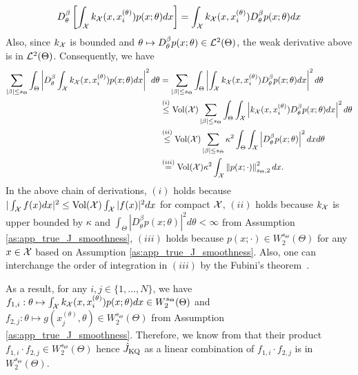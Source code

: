 \begin{equation*}
    D_\theta^\beta \left[\int_{\mathcal{X}} k_{\mathcal{X}} (x, x_i^{(\theta)}) p(x; \theta) dx \right] = \int_{\mathcal{X}} k_{\mathcal{X}} (x, x_i^{(\theta)}) D_\theta^\beta p(x; \theta) dx 
\end{equation*}
Also, since $k_{\mathcal{X}}$ is bounded and $\theta \mapsto D_\theta^\beta p(x; \theta) \in \mathcal{L}^2(\Theta)$, the weak derivative above is in $\mathcal{L}^2(\Theta)$.
Consequently, we have
\begin{align*}
    \sum_{ | \beta| \leq s_\Theta }  \int_\Theta \left| D_\theta^\beta \int_{\mathcal{X}} k_{\mathcal{X}} (x, x_i^{(\theta)}) p(x; \theta) dx \right|^2 d \theta 
    &= \sum_{ | \beta| \leq s_\Theta }  \int_\Theta \left| \int_{\mathcal{X}} k_{\mathcal{X}} (x, x_i^{(\theta)}) D_\theta^\beta p(x; \theta) dx  \right|^2 d \theta \\
    &\stackrel{(i)}{\leq} \text{Vol}(\mathcal{X}) \sum_{ | \beta| \leq s_\Theta }  \int_\Theta \int_{\mathcal{X}} \left|  k_{\mathcal{X}} (x, x_i^{(\theta)}) D_\theta^\beta p(x; \theta) dx  \right|^2 d \theta \\
    &\stackrel{(ii)}{\leq} \text{Vol}(\mathcal{X}) \sum_{ | \beta| \leq s_\Theta }  \kappa^2 \int_\Theta \int_{\mathcal{X}} \left| D_\theta^\beta p(x; \theta) \right|^2 dx d \theta \\
    &\stackrel{(iii)}{=} \text{Vol}(\mathcal{X}) \kappa^2 \int_{\mathcal{X}} \left\| p(x; \cdot) \right\|_{s_\Theta, 2}^2 dx .
\end{align*}
In the above chain of derivations, $(i)$ holds because $| \int_{\mathcal{X}} f(x) dx |^2 \leq \text{Vol}(\mathcal{X}) \int_{\mathcal{X}} | f(x) |^2 dx $ for compact $\mathcal{X}$, $(ii)$ holds because $k_{\mathcal{X}}$ is upper bounded by $\kappa$ and $\int_\Theta |D_\theta^\beta p(x; \theta)|^2 d\theta < \infty$ from Assumption \ref{as:app_true_J_smoothness}, $(iii)$ holds because 
$p(x; \cdot) \in W_2^{s_\Theta}(\Theta)$ for any $x \in \mathcal{X}$ based on Assumption \ref{as:app_true_J_smoothness}. Also, one can interchange the order of integration in $(iii)$ by the Fubini's theorem~\citep{rudin1964principles}.

As a result, for any $i, j \in \{1, \ldots, N\}$, we have $f_{1, i}: \theta \mapsto \int_{\mathcal{X}} k_{\mathcal{X}} (x, x_i^{(\theta)}) p(x; \theta) dx \in W_2^{s_\Theta}(\Theta)$ and $f_{2, j}: \theta \mapsto g(x_j^{(\theta)}, \theta) \in W_2^{s_\Theta}(\Theta)$ from Assumption \ref{as:app_true_J_smoothness}. 
Therefore, we know from  that their product $f_{1, i} \cdot f_{2,j} \in W_2^{s_\Theta} (\Theta)$ hence $\hat{J}_{\text{KQ}}$ as a linear combination of $f_{1, i} \cdot f_{2,j}$ is in $W_2^{s_\Theta} (\Theta)$.


